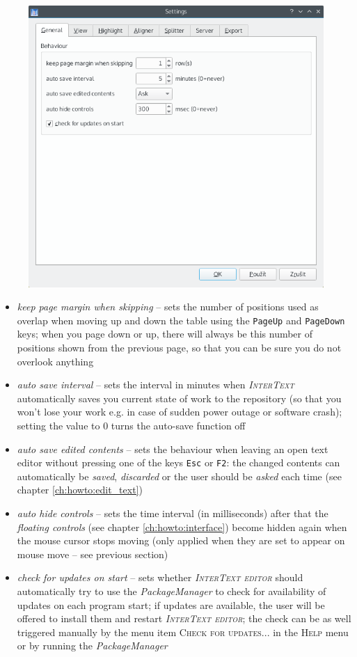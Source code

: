 \documentclass[a4paper,10pt,oneside]{book}
\newcommand{\IT}{\textit{\textsc{InterText}}\xspace}
\newcommand{\ITeditor}{\textit{\textsc{InterText editor}}\xspace}
\newcommand{\keys}[1]{\texttt{#1}}
\newcommand{\menu}[1]{\textsc{#1}}
\begin{document}
\begin{figure}[htbf]
 \includegraphics[width=\textwidth]{screenshots/settings_general.png}
\end{figure}

\begin{itemize}
 \item \emph{keep page margin when skipping} -- sets the number of positions used as overlap when moving up and down the table using the \keys{PageUp} and \keys{PageDown} keys; when you page down or up, there will always be this number of positions shown from the previous page, so that you can be sure you do not overlook anything
 \item \emph{auto save interval} -- sets the interval in minutes when \IT automatically saves you current state of work to the repository (so that you won't lose your work e.g. in case of sudden power outage or software crash); setting the value to 0 turns the auto-save function off
 \item \emph{auto save edited contents} -- sets the behaviour when leaving an open text editor without pressing one of the keys \keys{Esc} or \keys{F2}: the changed contents can automatically be \emph{saved}, \emph{discarded} or the user should be \emph{asked} each time (see chapter \ref{ch:howto:edit_text})
 \item \emph{auto hide controls} -- sets the time interval (in milliseconds) after that the \emph{floating controls} (see chapter \ref{ch:howto:interface}) become hidden again when the mouse cursor stops moving (only applied when they are set to appear on mouse move -- see previous section)
 \item \emph{check for updates on start} -- sets whether \ITeditor should automatically try to use the \emph{PackageManager} to check for availability of updates on each program start; if updates are available, the user will be offered to install them and restart \ITeditor; the check can be as well triggered manually by the menu item \menu{Check for updates...} in the \menu{Help} menu or by running the \emph{PackageManager}
\end{itemize}
\end{document}
